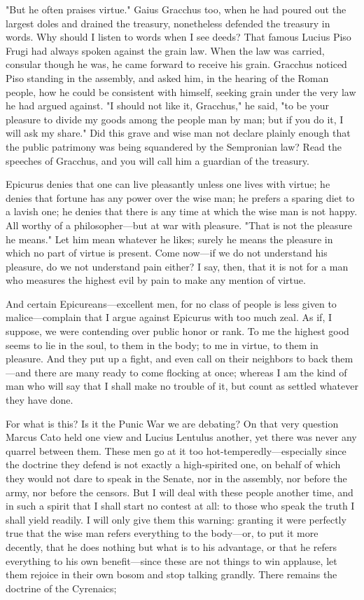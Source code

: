  "But he often praises virtue." Gaius Gracchus too, when he had poured out the largest doles and drained the treasury, nonetheless defended the treasury in words. Why should I listen to words when I see deeds? That famous Lucius Piso Frugi had always spoken against the grain law. When the law was carried, consular though he was, he came forward to receive his grain. Gracchus noticed Piso standing in the assembly, and asked him, in the hearing of the Roman people, how he could be consistent with himself, seeking grain under the very law he had argued against. "I should not like it, Gracchus," he said, "to be your pleasure to divide my goods among the people man by man; but if you do it, I will ask my share." Did this grave and wise man not declare plainly enough that the public patrimony was being squandered by the Sempronian law? Read the speeches of Gracchus, and you will call him a guardian of the treasury.

 Epicurus denies that one can live pleasantly unless one lives with virtue; he denies that fortune has any power over the wise man; he prefers a sparing diet to a lavish one; he denies that there is any time at which the wise man is not happy. All worthy of a philosopher—but at war with pleasure. "That is not the pleasure he means." Let him mean whatever he likes; surely he means the pleasure in which no part of virtue is present. Come now—if we do not understand his pleasure, do we not understand pain either? I say, then, that it is not for a man who measures the highest evil by pain to make any mention of virtue.

 And certain Epicureans—excellent men, for no class of people is less given to malice—complain that I argue against Epicurus with too much zeal. As if, I suppose, we were contending over public honor or rank. To me the highest good seems to lie in the soul, to them in the body; to me in virtue, to them in pleasure. And they put up a fight, and even call on their neighbors to back them—and there are many ready to come flocking at once; whereas I am the kind of man who will say that I shall make no trouble of it, but count as settled whatever they have done.

 For what is this? Is it the Punic War we are debating? On that very question Marcus Cato held one view and Lucius Lentulus another, yet there was never any quarrel between them. These men go at it too hot-temperedly—especially since the doctrine they defend is not exactly a high-spirited one, on behalf of which they would not dare to speak in the Senate, nor in the assembly, nor before the army, nor before the censors. But I will deal with these people another time, and in such a spirit that I shall start no contest at all: to those who speak the truth I shall yield readily. I will only give them this warning: granting it were perfectly true that the wise man refers everything to the body—or, to put it more decently, that he does nothing but what is to his advantage, or that he refers everything to his own benefit—since these are not things to win applause, let them rejoice in their own bosom and stop talking grandly. There remains the doctrine of the Cyrenaics;

